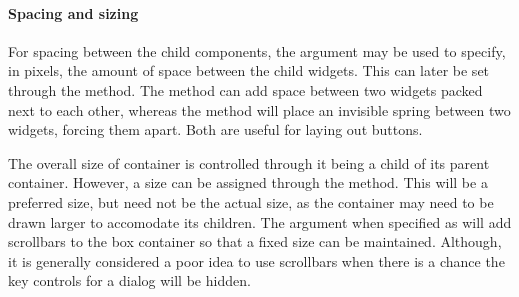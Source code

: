 \paragraph{Spacing and sizing}
For spacing between the child components, the argument
 may be used to specify, in pixels, the
amount of space between the child widgets. This can later be set
through the  method. The method
 can add space between two widgets packed
next to each other, whereas the method  will place
an invisible spring between two widgets, forcing them apart.  Both are
useful for laying out buttons.

The overall size of  container is controlled through it
being a child of its parent container. However, a size can be assigned
through the  method. This will be a
preferred size, but need not be the actual size, as the container may
need to be drawn larger to accomodate its children. The argument
 when specified as  will
add scrollbars to the box container so that a fixed size can be
maintained. Although, it is generally considered a poor idea to use
scrollbars when there is a chance the key controls for a dialog will
be hidden.


